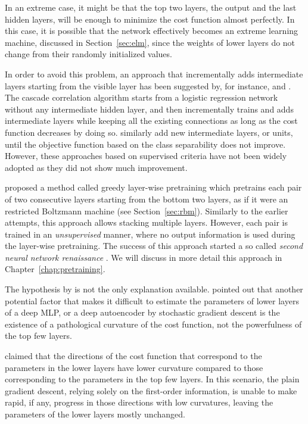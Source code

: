 \documentclass[dissertation,nocontribution]{aaltoseries}
\begin{document}
In an extreme case, it might be that the top two layers, the
output and the last hidden layers, will be enough to minimize
the cost function almost perfectly. In this case, it is
possible that the network effectively becomes an extreme
learning machine, discussed in Section~\ref{sec:elm}, since
the weights of lower layers do not change from their
randomly initialized values. 

In order to avoid this problem, an approach that
incrementally adds intermediate layers starting from the
visible layer has been suggested by, for instance,
\citet{Fahlman1990} and \citet{Lengelle1996}.  The cascade
correlation algorithm \citep{Fahlman1990} starts from a
logistic regression network without any intermediate hidden
layer, and then incrementally trains and adds intermediate
layers while keeping all the existing connections as long as
the cost function decreases by doing so.
\citet{Lengelle1996} similarly add new intermediate layers,
or units, until the objective function based on the class
separability does not improve.  However, these approaches
based on supervised criteria have not been widely adopted as
they did not show much improvement.

\citet{Hinton2006} proposed a method called greedy
layer-wise pretraining which pretrains each pair of two
consecutive layers starting from the bottom two layers, as
if it were an restricted Boltzmann machine (see
Section~\ref{sec:rbm}). Similarly to the earlier attempts,
this approach allows stacking multiple layers. However, each
pair is trained in an \textit{unsupervised} manner, where
no output information is used during the layer-wise
pretraining. The success of this approach started a so
called \textit{second neural network renaissance}
\citep{Schmidhuber2011}.  We will discuss in more detail this
approach in Chapter~\ref{chap:pretraining}.

The hypothesis by \citet{Bengio2007nips} is not the only
explanation available.  \citet{Martens2010} pointed out that
another potential factor that makes it difficult to estimate the
parameters of lower layers of a deep MLP, or a deep autoencoder
by stochastic gradient descent is the existence of a pathological
curvature of the cost function, not the powerfulness of the top
few layers. 

\citet{Martens2010} claimed that the directions of the cost
function that correspond to the parameters in the lower
layers have lower curvature compared to those corresponding
to the parameters in the top few layers. In this scenario,
the plain gradient descent, relying solely on the first-order
information, is unable to make rapid, if any, progress in
those directions with low curvatures, leaving the parameters
of the lower layers mostly unchanged.
\end{document}
